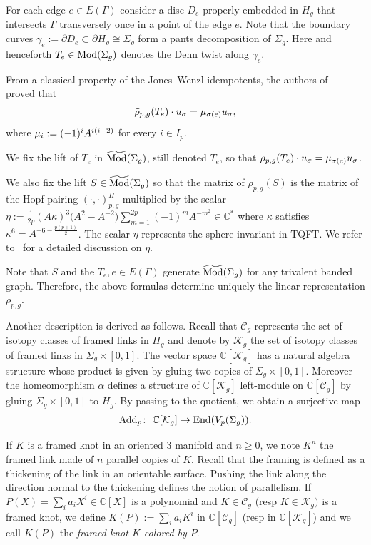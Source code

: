 \documentclass[pdftex]{sigma}
\numberwithin{equation}{section}
\begin{document}
For each edge $e\in E(\Gamma)$ consider a disc $D_e$ properly embedded in $H_g$ that intersects $\Gamma$ transversely once in a point of the edge $e$. Note that the boundary curves $\gamma_e := \partial D_e \subset \partial H_g \cong \Sigma_g$ form a pants decomposition of $\Sigma_g$. Here and henceforth $T_e\in \operatorname{Mod}(\Sigma_g)$ denotes the Dehn twist along $\gamma_e$.

From a classical property of the Jones--Wenzl idempotents, the authors of~\cite{BHMV2} proved that
\begin{gather*} \tilde{\rho}_{p,g}(T_e) \cdot u_{\sigma} = \mu_{\sigma(e)} u_{\sigma}, \end{gather*}
where $\mu_{i} := (-1)^i A^{i(i+2)}$ for every $i\in I_p$.

We fix the lift of $T_e$ in $\widetilde{\operatorname{Mod}}(\Sigma_g)$, still denoted $T_e$, so that $ \rho_{p,g}(T_e) \cdot u_{\sigma} = \mu_{\sigma(e)} u_{\sigma}$.

We also fix the lift $S\in\widetilde{\operatorname{Mod}}(\Sigma_g)$ so that the matrix of $\rho_{p,g}(S)$ is the matrix of the Hopf pairing $(\cdot, \cdot )^H_{p,g}$ multiplied by the scalar $\eta:=\frac{1}{2p}(A\kappa)^3\big(A^2-A^{-2}\big)\sum\limits_{m=1}^{2p}{(-1)^mA^{-m^2}}\in \mathbb{C}^*$ where $\kappa$ satisfies $\kappa^6=A^{-6-\frac{p(p+1)}{2}}$. The scalar $\eta$ represents the sphere invariant in TQFT. We refer to~\cite{BHMV2} for a detailed discussion on $\eta$.

 Note that $S$ and the $ T_e, e\in E(\Gamma)$ generate $\widetilde{\operatorname{Mod}}(\Sigma_g)$ for any trivalent banded graph. Therefore, the above formulas determine uniquely the linear representation $\rho_{p,g}$.

Another description is derived as follows. Recall that $\mathcal{C}_g$ represents the set of isotopy classes of framed links in $H_g$ and denote by $\mathcal{K}_g$ the set of isotopy classes of framed links in $\Sigma_g\times [0,1]$. The vector space $\mathbb{C}[\mathcal{K}_g]$ has a natural algebra structure whose product is given by gluing two copies of $\Sigma_g\times[0,1]$. Moreover the homeomorphism $\alpha$ defines a structure of $\mathbb{C}[\mathcal{K}_g]$ left-module on $\mathbb{C}[\mathcal{C}_g]$ by gluing $\Sigma_g\times[0,1]$ to $H_g$. By passing to the quotient, we obtain a surjective map
\begin{gather*} \operatorname{Add}_p \colon \ \mathbb{C}[\mathcal{K}_g] \rightarrow \operatorname{End}(V_p(\Sigma_g)).\end{gather*}

If $K$ is a framed knot in an oriented $3$ manifold and $n\geq 0$, we note $K^n$ the framed link made of $n$ parallel copies of $K$. Recall that the framing is defined as a thickening of the link in an orientable surface. Pushing the link along the direction normal to the thickening defines the notion of parallelism. If $P(X)=\sum_i a_i X^i \in \mathbb{C}[X]$ is a polynomial and $K\in \mathcal{C}_g$ (resp $K\in \mathcal{K}_g)$ is a framed knot, we define $K(P):=\sum_i a_i K^i $ in $\mathbb{C}[\mathcal{C}_g]$ (resp in $\mathbb{C}[\mathcal{K}_g]$) and we call $K(P)$ the \textit{framed knot $K$ colored by $P$}.
\end{document}
